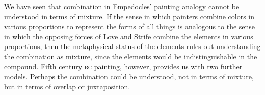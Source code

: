 
We have seen that combination in Empedocles' painting analogy cannot be understood in terms of mixture. If the sense in which painters combine colors in various proportions to represent the forms of all things is analogous to the sense in which the opposing forces of Love and Strife combine the elements in various proportions, then the metaphysical status of the elements rules out understanding the combination as mixture, since the elements would be indistinguishable in the compound. Fifth century \textsc{bc} painting, however, provides us with two further models. Perhaps the combination could be understood, not in terms of mixture, but in terms of overlap or juxtaposition. 

